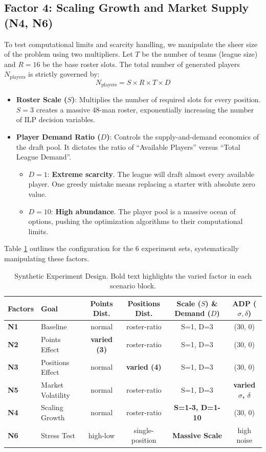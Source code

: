 \documentclass[11pt,a4paper]{article}
\begin{document}
\subsection{Factor 4: Scaling Growth and Market Supply (N4, N6)}
To test computational limits and scarcity handling, we manipulate the sheer size of the problem using two multipliers. Let $T$ be the number of teams (league size) and $R=16$ be the base roster slots. The total number of generated players $N_{\text{players}}$ is strictly governed by:
\[ N_{\text{players}} = S \times R \times T \times D \]
\begin{itemize}[leftmargin=1.5em]
    \item \textbf{Roster Scale ($S$)}: Multiplies the number of required slots for every position. $S=3$ creates a massive 48-man roster, exponentially increasing the number of ILP decision variables.
    \item \textbf{Player Demand Ratio ($D$)}: Controls the supply-and-demand economics of the draft pool. It dictates the ratio of ``Available Players'' versus ``Total League Demand''.
    \begin{itemize}
        \item $D = 1$: \textbf{Extreme scarcity}. The league will draft almost every available player. One greedy mistake means replacing a starter with absolute zero value.
        \item $D = 10$: \textbf{High abundance}. The player pool is a massive ocean of options, pushing the optimization algorithms to their computational limits.
    \end{itemize}
\end{itemize}

Table \ref{tab:scenarios_setup} outlines the configuration for the 6 experiment sets, systematically manipulating these factors.

\begin{table}[H]
\centering
\small
\caption{Synthetic Experiment Design. Bold text highlights the varied factor in each scenario block.}
\label{tab:scenarios_setup}
\begin{tabular}{llcccc}
\toprule
Factors & Goal & Points Dist. & Positions Dist. & Scale ($S$) \& Demand ($D$) & ADP ($\sigma, \delta$) \\
\midrule
\textbf{N1} & Baseline & normal & roster-ratio & S=1, D=3 & (30, 0) \\
\textbf{N2} & Points Effect & \textbf{varied (3)} & roster-ratio & S=1, D=3 & (30, 0) \\
\textbf{N3} & Positions Effect & normal & \textbf{varied (4)} & S=1, D=3 & (30, 0) \\
\textbf{N5} & Market Volatility & normal & roster-ratio & S=1, D=3 & \textbf{varied $\sigma$, $\delta$} \\
\textbf{N4} & Scaling Growth & normal & roster-ratio & \textbf{S=1-3, D=1-10} & (30, 0) \\
\textbf{N6} & Stress Test & high-low & single-position & \textbf{Massive Scale} & high noise \\
\bottomrule
\end{tabular}
\end{table}
\end{document}
